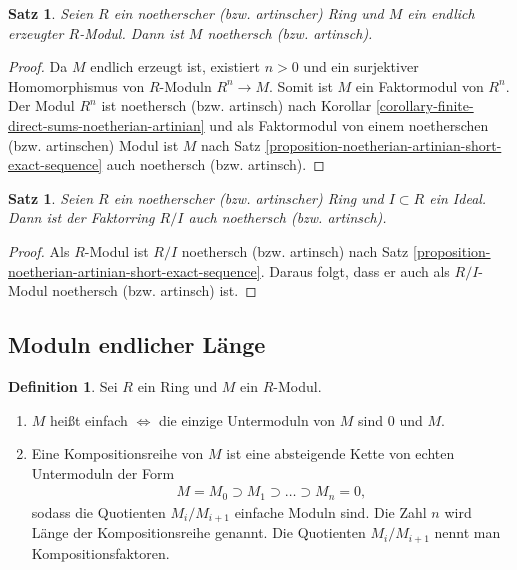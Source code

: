 \documentclass[reqno,12pt]{article}
\numberwithin{equation}{section}
\theoremstyle{plain}
\newtheorem{proposition}[thm]{Satz}
\theoremstyle{definition}
\newtheorem{definition}[thm]{Definition}
\begin{document}
\begin{proposition}\label{proposition-finitely-generated-modules-over-noetherian-artinian-rings}
Seien $R$ ein noetherscher (bzw. artinscher) Ring und $M$ ein endlich erzeugter $R$-Modul. Dann ist $M$ noethersch (bzw. artinsch).
\end{proposition}

\begin{proof}
Da $M$ endlich erzeugt ist, existiert $n > 0$ und ein surjektiver Homomorphismus von $R$-Moduln $R^n \to M$. Somit ist $M$ ein Faktormodul von $R^n$. Der Modul $R^n$ ist noethersch (bzw. artinsch) nach Korollar \ref{corollary-finite-direct-sums-noetherian-artinian} und als Faktormodul von einem noetherschen (bzw. artinschen) Modul ist $M$ nach Satz \ref{proposition-noetherian-artinian-short-exact-sequence} auch noethersch (bzw. artinsch).
\end{proof}


\begin{proposition}\label{proposition-quotient-ring-noetherian-artinian}
Seien $R$ ein noetherscher (bzw. artinscher) Ring und $I \subset R$ ein Ideal. Dann ist der Faktorring $R/I$ auch noethersch (bzw. artinsch).
\end{proposition}

\begin{proof}
Als $R$-Modul ist $R/I$ noethersch (bzw. artinsch) nach Satz \ref{proposition-noetherian-artinian-short-exact-sequence}. Daraus folgt, dass er auch als $R/I$-Modul noethersch (bzw. artinsch) ist.
\end{proof}




\vspace{10pt}

\subsection{Moduln endlicher Länge}
\begin{definition}
Sei $R$ ein Ring und $M$ ein $R$-Modul.
\begin{enumerate}
\item $M$ heißt {\sf einfach} $\iff$ die einzige Untermoduln von $M$ sind $0$ und $M$.
\item Eine {\sf Kompositionsreihe} von $M$ ist eine absteigende Kette von echten Untermoduln der Form
\begin{align*}
M = M_0 \supset M_1 \supset \dots \supset M_n=0,
\end{align*}
sodass die Quotienten $M_i/M_{i+1}$ einfache Moduln sind. Die Zahl $n$ wird {\sf Länge} der Kompositionsreihe genannt. Die Quotienten $M_i/M_{i+1}$ nennt man {\sf Kompositionsfaktoren}.
\end{enumerate}
\end{definition}
\end{document}
